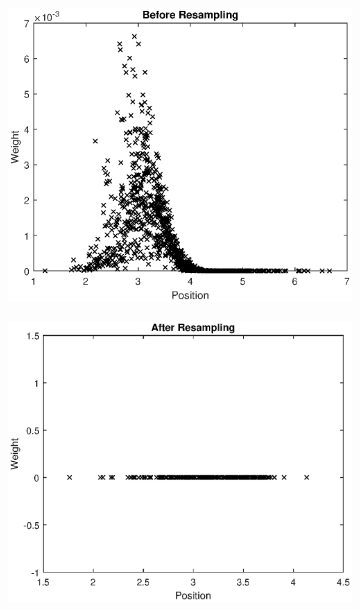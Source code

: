 \documentclass{article}
\begin{document}
\begin{figure}
\begin{subfigure}{.6\textwidth}
    \includegraphics[scale=0.6]{before_sampling_2.eps}
\end{subfigure}%
\begin{subfigure}{.6\textwidth}
    \centering
    \includegraphics[scale=0.6]{after_sampling_2.eps}
\end{subfigure}
\begin{subfigure}{0.6\textwidth}
    \centering

\end{subfigure}
\end{figure}
\end{document}
